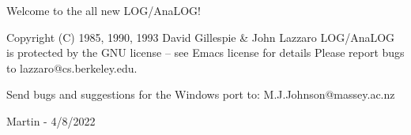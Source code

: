 
              Welcome to the all new LOG/AnaLOG!

        Copyright (C) 1985, 1990, 1993 David Gillespie & John Lazzaro
  LOG/AnaLOG is protected by the GNU license -- see Emacs license for details
             Please report bugs to lazzaro@cs.berkeley.edu.  


              Send bugs and suggestions for the Windows port to:
              M.J.Johnson@massey.ac.nz

              Martin - 4/8/2022
